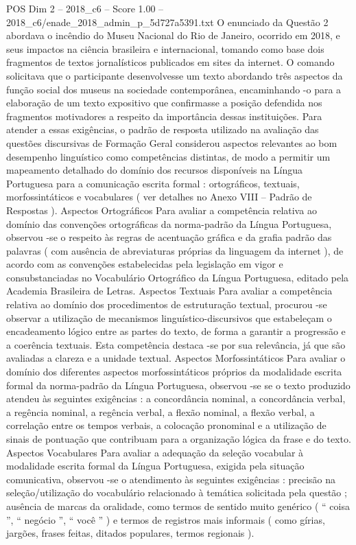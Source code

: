 \begin{textsample}{POS Dim 2 – 2018\_c6 – Score 1.00 – 2018\_c6/enade\_2018\_admin\_p\_5d727a5391.txt}
O enunciado da Questão 2 abordava o incêndio do Museu Nacional do Rio de Janeiro, ocorrido em 2018, e seus impactos na ciência brasileira e internacional, tomando como base dois fragmentos de textos jornalísticos publicados em sites da internet.
O comando solicitava que o participante desenvolvesse um texto abordando três aspectos da função social dos museus na sociedade contemporânea, encaminhando -o para a elaboração de um texto expositivo que confirmasse a posição defendida nos fragmentos motivadores a respeito da importância dessas instituições.
Para atender a essas exigências, o padrão de resposta utilizado na avaliação das questões discursivas de Formação Geral considerou aspectos relevantes ao bom desempenho linguístico como competências distintas, de modo a permitir um mapeamento detalhado do domínio dos recursos disponíveis na Língua Portuguesa para a comunicação escrita formal : ortográficos, textuais, morfossintáticos e vocabulares ( ver detalhes no Anexo VIII – Padrão de Respostas ).
Aspectos Ortográficos Para avaliar a competência relativa ao domínio das convenções ortográficas da norma-padrão da Língua Portuguesa, observou -se o respeito às regras de acentuação gráfica e da grafia padrão das palavras ( com ausência de abreviaturas próprias da linguagem da internet ), de acordo com as convenções estabelecidas pela legislação em vigor e consubstanciadas no Vocabulário Ortográfico da Língua Portuguesa, editado pela Academia Brasileira de Letras.
Aspectos Textuais Para avaliar a competência relativa ao domínio dos procedimentos de estruturação textual, procurou -se observar a utilização de mecanismos linguístico-discursivos que estabeleçam o encadeamento lógico entre as partes do texto, de forma a garantir a progressão e a coerência textuais.
Esta competência destaca -se por sua relevância, já que são avaliadas a clareza e a unidade textual.
Aspectos Morfossintáticos Para avaliar o domínio dos diferentes aspectos morfossintáticos próprios da modalidade escrita formal da norma-padrão da Língua Portuguesa, observou -se se o texto produzido atendeu às seguintes exigências : a concordância nominal, a concordância verbal, a regência nominal, a regência verbal, a flexão nominal, a flexão verbal, a correlação entre os tempos verbais, a colocação pronominal e a utilização de sinais de pontuação que contribuam para a organização lógica da frase e do texto.
Aspectos Vocabulares Para avaliar a adequação da seleção vocabular à modalidade escrita formal da Língua Portuguesa, exigida pela situação comunicativa, observou -se o atendimento às seguintes exigências : precisão na seleção/utilização do vocabulário relacionado à temática solicitada pela questão ; ausência de marcas da oralidade, como termos de sentido muito genérico ( “ coisa ”, “ negócio ”, “ você ” ) e termos de registros mais informais ( como gírias, jargões, frases feitas, ditados populares, termos regionais ).

\end{textsample}
